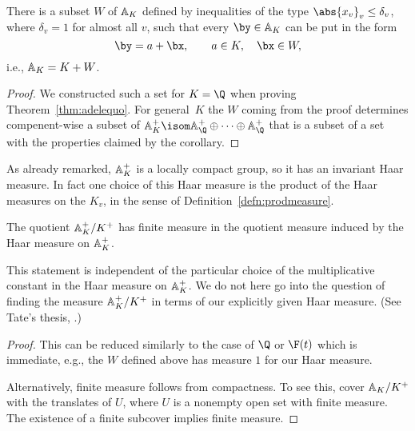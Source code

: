 \documentclass[11pt]{book}
\begin{document}
\begin{ch}
\begin{corollary}\label{cor:subsetW}
There is a subset $W$ of $\AA_K$ defined by inequalities of the
type $\abs{x_v}_v \leq \delta_v$, where $\delta_v=1$
for almost all $v$, such that every $\by\in\AA_K$ can
be put in the form
$$
  \by = a + \bx, \qquad a\in K, \quad \bx \in W,
$$
i.e., $\AA_K = K + W$.
\end{corollary}
\begin{proof}
  We constructed such a set for $K=\Q$ when proving
  Theorem~\ref{thm:adelequo}.  For general~$K$ the $W$ coming from the
  proof determines compenent-wise a subset of $\AA_K^+\isom
  \AA_\Q^+\oplus \cdots \oplus \AA_\Q^+$ that is a subset of a set
  with the properties claimed by the corollary.
\end{proof}

As already remarked, $\AA_K^+$ is a locally compact group, so it has
an invariant Haar measure.  In fact one choice of this Haar measure is
the product of the Haar measures on the $K_v$, in the sense
of Definition~\ref{defn:prodmeasure}.

\begin{corollary}\label{cor:finitemeasure}
The quotient $\AA_K^+/K^+$ has finite measure in the quotient measure
induced by the Haar measure on $\AA_K^+$.
\end{corollary}
\begin{remark}
This statement is independent of the particular choice
of the multiplicative constant in the Haar measure
on $\AA_K^+$.  We do not here go into the question of
finding the measure $\AA_K^+/K^+$ in terms of our
explicitly given Haar measure.  (See Tate's thesis,
\cite[Chapter XV]{cassels-frohlich}.)
\end{remark}
\begin{proof}
This can be reduced similarly to the case of $\Q$
or $\F(t)$ which is immediate, e.g., the $W$ defined
above has measure $1$ for our Haar measure.

Alternatively, finite measure follows from compactness.  To see
this,  cover
$\AA_K/K^+$ with the translates of $U$, where $U$ is a nonempty open
set with finite measure.  The existence of a finite subcover implies
finite measure.
\end{proof}


\end{ch}
\end{document}
